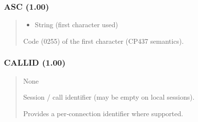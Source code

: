 \documentclass[letterpaper,10pt,english]{sphinxmanual}
\begin{document}
\subsubsection{ASC (1.00)}
\label{\detokenize{ppl:asc-1-00}}\begin{quote}

\sphinxAtStartPar
{}
\begin{description}
\begin{itemize}
\item {} 
\sphinxAtStartPar
{} \textendash{} String (first character used)

\end{itemize}

\sphinxAtStartPar
Code (0\textendash{}255) of the first character (CP437 semantics).

\end{description}

\sphinxAtStartPar
{}
\begin{quote}

\begin{sphinxVerbatim}[commandchars=\\\{\}]
  
\end{sphinxVerbatim}
\end{quote}
\end{quote}


\subsubsection{CALLID (1.00)}
\label{\detokenize{ppl:callid-1-00}}\begin{quote}

\sphinxAtStartPar
{}
\begin{description}
\sphinxAtStartPar
None

\sphinxAtStartPar
Session / call identifier (may be empty on local sessions).

\sphinxAtStartPar
Provides a per‑connection identifier where supported.

\end{description}
\end{quote}
\end{document}
